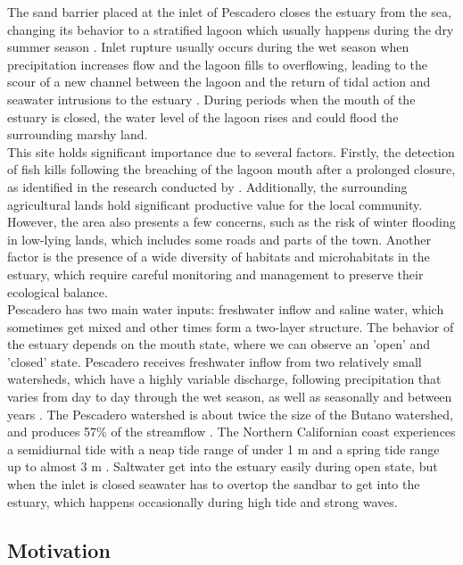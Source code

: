 \documentclass[tesis.tex]{subfiles}
\begin{document}
The sand barrier placed at the inlet of Pescadero closes the estuary from the sea, changing its behavior to a stratified lagoon which usually happens during the dry summer season \citep{Williams2014}. Inlet rupture usually occurs during the wet season when precipitation increases flow and the lagoon fills to overflowing, leading to the scour of a new channel between the lagoon and the return of tidal action and seawater intrusions to the estuary \citep{largier2015}. During periods when the mouth of the estuary is closed, the water level of the lagoon rises and could flood the surrounding marshy land. \\

This site holds significant importance due to several factors. Firstly, the detection of fish kills following the breaching of the lagoon mouth after a prolonged closure, as identified in the research conducted by \cite{largier2015}. Additionally, the surrounding agricultural lands hold significant productive value for the local community. However, the area also presents a few concerns, such as the risk of winter flooding in low-lying lands, which includes some roads and parts of the town. Another factor is the presence of a wide diversity of habitats and microhabitats in the estuary, which require careful monitoring and management to preserve their ecological balance.\\

Pescadero has two main water inputs: freshwater inflow and saline water, which sometimes get mixed and other times form a two-layer structure. The behavior of the estuary depends on the mouth state, where we can observe an 'open' and 'closed' state. Pescadero receives freshwater inflow from two relatively small watersheds, which have a highly variable discharge, following precipitation that varies from day to day through the wet season, as well as seasonally and between years \citep{largier2015}. The Pescadero watershed is about twice the size of the Butano watershed, and produces 57\% of the streamflow \citep{Williams2014}. The Northern Californian coast experiences a semidiurnal tide with a neap tide range of under 1 m and a spring tide range up to almost 3 m \citep{Williams2014}. Saltwater get into the estuary easily during open state, but when the inlet is closed seawater has to overtop the sandbar to get into the estuary, which happens occasionally during high tide and strong waves.\\

\subsection{Motivation}
\end{document}
